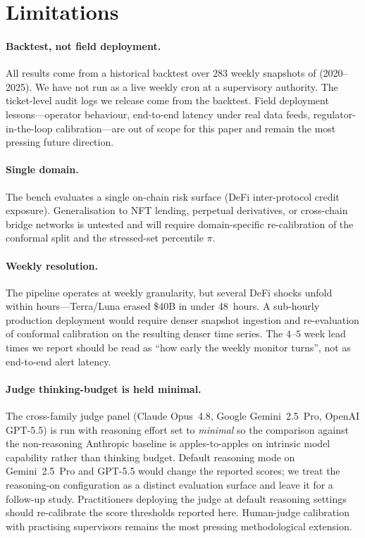 \section*{Limitations}
\label{sec:limitations}

\paragraph{Backtest, not field deployment.}
All results come from a historical backtest over $283$ weekly
snapshots of \corpusname{} (2020--2025). We have not run
\sysname{} as a live weekly cron at a supervisory authority. The
ticket-level audit logs we release come from the backtest. Field
deployment lessons---operator behaviour, end-to-end latency under
real data feeds, regulator-in-the-loop calibration---are out of
scope for this paper and remain the most pressing future direction.

\paragraph{Single domain.}
The bench evaluates a single on-chain risk surface (DeFi
inter-protocol credit exposure). Generalisation to NFT lending,
perpetual derivatives, or cross-chain bridge networks is untested
and will require domain-specific re-calibration of the conformal
split and the stressed-set percentile $\pi$.

\paragraph{Weekly resolution.}
The pipeline operates at weekly granularity, but several DeFi shocks
unfold within hours---Terra/Luna erased \$40B in under 48~hours. A
sub-hourly production deployment would require denser snapshot
ingestion and re-evaluation of conformal calibration on the
resulting denser time series. The $4$--$5$ week lead times we
report should be read as ``how early the weekly monitor turns'',
not as end-to-end alert latency.

\paragraph{Judge thinking-budget is held minimal.}
The cross-family judge panel (Claude Opus~4.8, Google
Gemini~2.5~Pro, OpenAI GPT-5.5) is run with reasoning effort set
to \emph{minimal} so the comparison against the
non-reasoning Anthropic baseline is apples-to-apples on
intrinsic model capability rather than thinking budget. Default
reasoning mode on Gemini~2.5~Pro and GPT-5.5 would change the
reported scores; we treat the reasoning-on configuration as a
distinct evaluation surface and leave it for a follow-up study.
Practitioners deploying the judge at default reasoning settings
should re-calibrate the score thresholds reported here. Human-judge
calibration with practising supervisors remains the most pressing
methodological extension.

